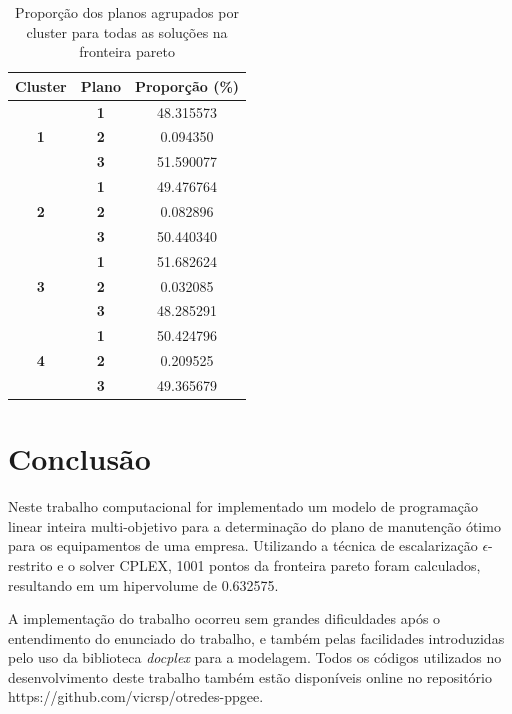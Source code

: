 \documentclass[conference]{IEEEtran}
\begin{document}
\begin{table}[h!]
	\centering
	\caption{Proporção dos planos agrupados por cluster para todas as soluções na fronteira pareto}
	\label{tab:proportions}
	\begin{tabular}{|c|c|c|}
		\hline
		\textbf{Cluster}            & \textbf{Plano} & \textbf{Proporção (\%)} \\ \hline
		\multirow{3}{*}{\textbf{1}} & \textbf{1}     & 48.315573               \\ \cline{2-3} 
		& \textbf{2}     & 0.094350                \\ \cline{2-3} 
		& \textbf{3}     & 51.590077               \\ \hline
		\multirow{3}{*}{\textbf{2}} & \textbf{1}     & 49.476764               \\ \cline{2-3} 
		& \textbf{2}     & 0.082896                \\ \cline{2-3} 
		& \textbf{3}     & 50.440340               \\ \hline
		\multirow{3}{*}{\textbf{3}} & \textbf{1}     & 51.682624               \\ \cline{2-3} 
		& \textbf{2}     & 0.032085                \\ \cline{2-3} 
		& \textbf{3}     & 48.285291               \\ \hline
		\multirow{3}{*}{\textbf{4}} & \textbf{1}     & 50.424796               \\ \cline{2-3} 
		& \textbf{2}     & 0.209525                \\ \cline{2-3} 
		& \textbf{3}     & 49.365679               \\ \hline
	\end{tabular}
\end{table}


\section{Conclusão}
Neste trabalho computacional for implementado um modelo de programação linear inteira multi-objetivo para a determinação do plano de manutenção ótimo para os equipamentos de uma empresa. Utilizando a técnica de escalarização $\epsilon$-restrito e o solver CPLEX, 1001 pontos da fronteira pareto foram calculados, resultando em um hipervolume de 0.632575. 

A implementação do trabalho ocorreu sem grandes dificuldades após o entendimento do enunciado do trabalho, e também pelas facilidades introduzidas pelo uso da biblioteca \textit{docplex} para a modelagem. Todos os códigos utilizados no desenvolvimento deste trabalho também estão disponíveis online no repositório https://github.com/vicrsp/otredes-ppgee.
\end{document}
